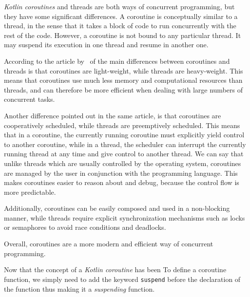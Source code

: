 \textit{Kotlin coroutines} and threads are both ways of concurrent programming, but they have some significant differences.
A coroutine is conceptually similar to a thread, in the sense that it takes a block of code to run concurrently with the rest of the code. However, a coroutine is not bound to any particular thread. It may suspend its execution in one thread and resume in another one.~\cite{kotlin-coroutines-your-first}

According to the article by~ of the main differences between coroutines and threads is that coroutines are light-weight, while threads are heavy-weight. This means that coroutines use much less memory and computational resources than threads, and can therefore be more efficient when dealing with large numbers of concurrent tasks.

Another difference pointed out in the same article, is that coroutines are cooperatively scheduled, while threads are preemptively scheduled. This means that in a coroutine, the currently running coroutine must explicitly yield control to another coroutine, while in a thread, the scheduler can interrupt the currently running thread at any time and give control to another thread. We can say that unlike threads which are usually controlled by the operating system, coroutines are managed by the user in conjunction with the programming language. This makes coroutines easier to reason about and debug, because the control flow is more predictable.

Additionally, coroutines can be easily composed and used in a non-blocking manner, while threads require explicit synchronization mechanisms such as locks or semaphores to avoid race conditions and deadlocks.

Overall, coroutines are a more modern and efficient way of concurrent programming.

% 

% 
Now that the concept of a \textit{Kotlin coroutine} has been 
To define a coroutine function, we simply need to add the keyword \texttt{suspend} before the declaration of the function thus making it a \textit{suspending} function.

